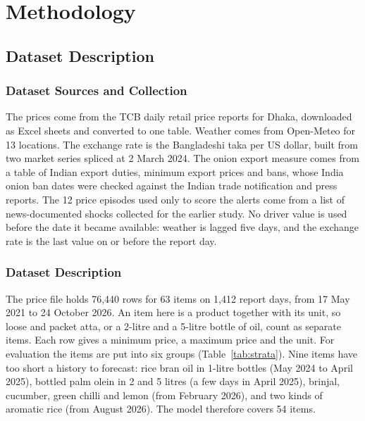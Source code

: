\chapter{Methodology}

\section{Dataset Description}

\subsection{Dataset Sources and Collection}
The prices come from the TCB daily retail price reports for Dhaka, downloaded as Excel sheets and converted to one table. Weather comes from Open-Meteo for 13 locations. The exchange rate is the Bangladeshi taka per US dollar, built from two market series spliced at 2 March 2024. The onion export measure comes from a table of Indian export duties, minimum export prices and bans, whose India onion ban dates were checked against the Indian trade notification and press reports. The 12 price episodes used only to score the alerts come from a list of news-documented shocks collected for the earlier study. No driver value is used before the date it became available: weather is lagged five days, and the exchange rate is the last value on or before the report day.

\subsection{Dataset Description}
The price file holds 76,440 rows for 63 items on 1,412 report days, from 17 May 2021 to 24 October 2026. An item here is a product together with its unit, so loose and packet atta, or a 2-litre and a 5-litre bottle of oil, count as separate items. Each row gives a minimum price, a maximum price and the unit. For evaluation the items are put into six groups (Table~\ref{tab:strata}). Nine items have too short a history to forecast: rice bran oil in 1-litre bottles (May 2024 to April 2025), bottled palm olein in 2 and 5 litres (a few days in April 2025), brinjal, cucumber, green chilli and lemon (from February 2026), and two kinds of aromatic rice (from August 2026). The model therefore covers 54 items.

\begin{table}[H]\centering\small
\caption[Items by evaluation group]{Items by evaluation group.}\label{tab:strata}

\par{}
\end{table}

